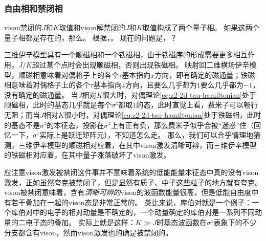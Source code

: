 \subsubsection{自由相和禁闭相}

vison禁闭的$J$和$K$取值和vison解禁闭的$J$和$K$取值构成了两个量子相。
如果这两个量子相都是存在的，那么。
根据，。
现在的问题是，？

三维伊辛模型具有一个顺磁相和一个铁磁相，由于铁磁序的形成需要更多相互作用，$J/K$超过某个点时会出现顺磁相，否则出现铁磁相。
映射回二维横场伊辛模型，顺磁相意味着对偶格子上的各个$\tau$基本指向$x$方向，即有确定的磁通量；铁磁相意味着对偶格子上的各个$\tau$基本指向$z$方向，且要么几乎都为$1$要么几乎都为$-1$，没有确定的磁通量。
当$J$相对$K$很大时，对偶理论\eqref{eq:z2-2d-tau-hamiltonian}处于顺磁相，此时的基态几乎就是每个$\sigma^z$都取$1$的态，此时直觉上看，费米子可以畅行无阻；而当$J$相对$K$很小时，对偶理论\eqref{eq:z2-2d-tau-hamiltonian}处于铁磁相，此时的基态不是$\sigma^z$的本征态，投影在$\sigma^z$上有正有负，那么费米子似乎会被“迷惑”住（回忆一下，$\sigma^z$实际上是跃迁矩阵元），不知道怎么走。
那么，我们可以合乎情理地猜测，三维伊辛模型的顺磁相对应着，在其中vison激发清晰可辨，而三维伊辛模型的铁磁相对应着，在其中量子涨落破坏了vison激发。

应注意vison激发被禁闭这件事并不意味着系统的低能能量本征态中真的没有vison激发，正如虽然夸克被禁闭了，但是显然有质子、中子这些粒子的地方就有夸克。
vison被禁闭意味着，含有\emph{清晰可辨的}vison的波函数能量很高，但是低能自由度中有若干叠加在一起的vison态是非常正常的。
类比来说，库伯对就是一个例子：一个库伯对中的电子的相对动量是不确定的，一个动量确定的库伯对是一系列不同动量的二电子态的叠加。
实际上就是这样：$K \gg J$时基态波函数在$\sigma^z$表象下的不少分支都含有vison，然而vison激发也的确是被禁闭的。

